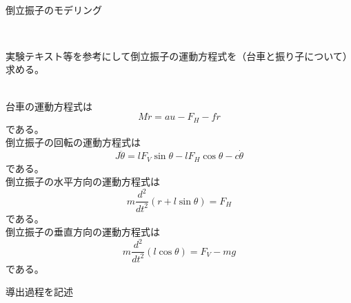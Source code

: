 \documentclass{jarticle}
\begin{document}
	\begin{enumerate}
		{\LARGE\item{}}\\
		\begin{enumerate}
			{\Large\item 倒立振子のモデリング}\\
			\begin{enumerate}
				{\large\item 実験テキスト等を参考にして倒立振子の運動方程式を（台車と振り子について）求める。}\\
					
					台車の運動方程式は\\
					\begin{equation}
						M\ddot{r}=au-F_{H}-f\dot{r}
					\end{equation}
					である。\\
					倒立振子の回転の運動方程式は\\
					\begin{equation}
						J\ddot{\theta}=lF_{V}\sin \theta -lF_{H}\cos \theta -c\dot{\theta}
					\end{equation}
					である。\\
					倒立振子の水平方向の運動方程式は\\
					\begin{equation}
						m\frac{d^{2}}{dt^{2}}(r+l\sin\theta) = F_{H}
					\end{equation}
					である。\\
					倒立振子の垂直方向の運動方程式は\\
					\begin{equation}
						m\frac{d^{2}}{dt^{2}}(l\cos\theta) = F_{V}-mg
					\end{equation}
					である。\\
					
				{\large\item 導出過程を記述}\\
				

\end{enumerate}
\end{enumerate}
\end{enumerate}
\end{document}
